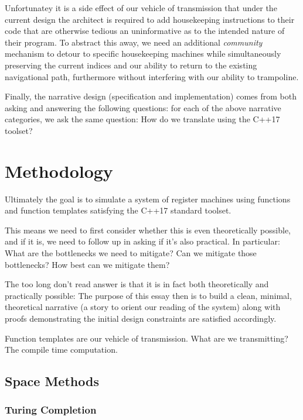 \documentclass[twoside]{article}
\begin{document}
\begin{enumerate}
Unfortunatey it is a side effect of our vehicle of transmission that under the current design the architect
is required to add housekeeping instructions to their code that are otherwise tedious an uninformative as
to the intended nature of their program. To abstract this away, we need an additional \emph{community}
mechanism to detour to specific housekeeping machines while simultaneously preserving the current indices
and our ability to return to the existing navigational path, furthermore without interfering with our
ability to trampoline.

\end{enumerate}

Finally, the narrative design (specification and implementation) comes from both asking and answering the following
questions: for each of the above narrative categories, we ask the same question: How do we translate using the C++17
toolset?

\section*{Methodology}

Ultimately the goal is to simulate a system of register machines using functions and function templates
satisfying the C++17 standard toolset.

This means we need to first consider whether this is even theoretically possible, and if it is, we need to follow
up in asking if it's also practical. In particular: What are the bottlenecks we need to mitigate? Can we mitigate
those bottlenecks? How best can we mitigate them?

The too long don't read answer is that it is in fact both theoretically and practically possible: The purpose of this
essay then is to build a clean, minimal, theoretical narrative (a story to orient our reading of the system) along
with proofs demonstrating the initial design constraints are satisfied accordingly.

Function templates are our vehicle of transmission. What are we transmitting? The compile time computation.

\subsection*{Space Methods}

\subsubsection*{Turing Completion}
\end{document}
